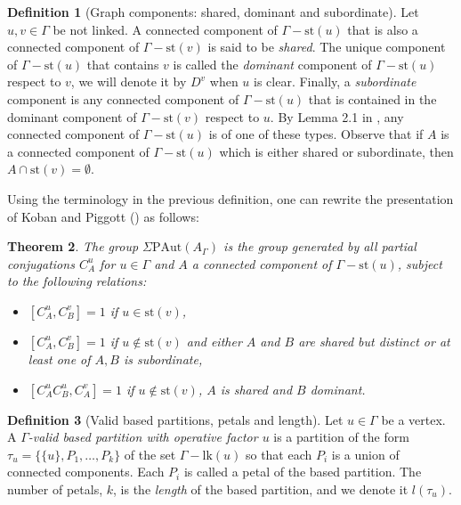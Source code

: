 \documentclass[a4paper]{amsart}
\newcommand{\G}{\Gamma}
\newcommand{\PAut}{\Sigma\mathrm{PAut}}
\newcommand{\lk}{\mathrm{lk}}
\newcommand{\st}{\mathrm{st}}
\newtheorem{teo}{Theorem}[section]
\theoremstyle{definition}
\newtheorem{defi}[teo]{Definition}
\theoremstyle{remark}
\begin{document}
\begin{defi}[Graph components: shared, dominant and subordinate]
     Let $u, v\in\Gamma$ be not linked.  A connected component of $\Gamma-\st(u)$ that is also a connected component of $\Gamma-\st(v)$ is said to be {\sl shared}. The unique component of $\Gamma-\st(u)$ that contains $v$ is called the {\sl dominant} component of $\G-\st(u)$ respect to $v$, we will denote it by $D^v$ when $u$ is clear. Finally, a {\sl subordinate} component is any connected component of $\Gamma-\st(u)$ that is contained in the dominant component of $\G-\st(v)$ respect to $u$. By Lemma 2.1 in \cite{DayWade}, any connected component of $\Gamma-\st(u)$ is of one of these types. Observe that if $A$ is a connected component of $\Gamma-\st(u)$ which is either shared or subordinate, then $A\cap\st(v)=\emptyset$.
     \label{defi:comp}
\end{defi}

Using the terminology in the previous definition, one can rewrite the presentation of Koban and Piggott (\cite{KoPi}) as follows:
\begin{teo}\label{teo:conmu}
    The group $\PAut(A_{\Gamma})$ is the group generated by all partial conjugations $C_{A}^u$ for $u\in \G$ and $A$ a connected component of $\G-\st(u)$, subject to the following relations:
 \begin{itemize}
     \item[i)] $\left[C_{A}^u, C_{B}^v\right]=1$ if  $u \in \st(v)$,
     \item[ii)]$\left[C_{A}^u, C_{B}^v\right]=1$ if $u \notin \st(v)$ and either $A$ and $B$ are shared but distinct or at least one of $A,B$  is subordinate,
     \item[iii)] $\left[C_{A}^u C_{B}^u, C_{A}^v\right]=1$ if $u \notin \st(v)$, $A$ is shared and $B$ dominant. \label{teo:presentation}
 \end{itemize}
\end{teo}



\begin{defi}[Valid based partitions, petals and length]
Let $u\in\G$ be a vertex. A {\sl $\G$-valid based partition with operative factor $u$} is a partition of the form $\tau_u=\{\{u\},P_1,\ldots,P_k\}$ of the set $\G-\lk(u)$ so that each $P_i$ is a union of connected components. Each $P_i$ is called a petal of the based partition.   The number of petals, $k$, is the 
    {\sl length} of the based partition, and we denote it $l(\tau_u)$. \label{defi:partitions}
\end{defi}
\end{document}

